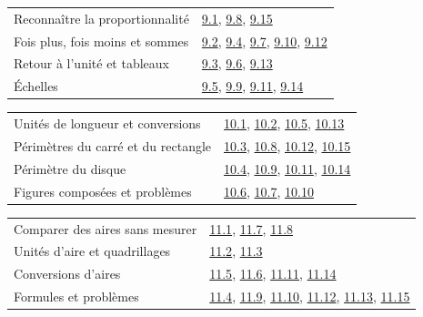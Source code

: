 \begin{tabularx}{\linewidth}{@{}Yl@{}}\toprule
Reconnaître la proportionnalité & \hyperref[exo-9-1]{9.1}, \hyperref[exo-9-8]{9.8}, \hyperref[exo-9-15]{9.15}\\[2mm]
Fois plus, fois moins et sommes & \hyperref[exo-9-2]{9.2}, \hyperref[exo-9-4]{9.4}, \hyperref[exo-9-7]{9.7}, \hyperref[exo-9-10]{9.10}, \hyperref[exo-9-12]{9.12}\\[2mm]
Retour à l’unité et tableaux & \hyperref[exo-9-3]{9.3}, \hyperref[exo-9-6]{9.6}, \hyperref[exo-9-13]{9.13}\\[2mm]
Échelles & \hyperref[exo-9-5]{9.5}, \hyperref[exo-9-9]{9.9}, \hyperref[exo-9-11]{9.11}, \hyperref[exo-9-14]{9.14}\\[2mm]
\bottomrule\end{tabularx}\par\vspace{4mm}
\clearpage
{}\fontsize{10}{13}\selectfont
{}\begin{tabularx}{\linewidth}{@{}Yl@{}}\toprule
Unités de longueur et conversions & \hyperref[exo-10-1]{10.1}, \hyperref[exo-10-2]{10.2}, \hyperref[exo-10-5]{10.5}, \hyperref[exo-10-13]{10.13}\\[2mm]
Périmètres du carré et du rectangle & \hyperref[exo-10-3]{10.3}, \hyperref[exo-10-8]{10.8}, \hyperref[exo-10-12]{10.12}, \hyperref[exo-10-15]{10.15}\\[2mm]
Périmètre du disque & \hyperref[exo-10-4]{10.4}, \hyperref[exo-10-9]{10.9}, \hyperref[exo-10-11]{10.11}, \hyperref[exo-10-14]{10.14}\\[2mm]
Figures composées et problèmes & \hyperref[exo-10-6]{10.6}, \hyperref[exo-10-7]{10.7}, \hyperref[exo-10-10]{10.10}\\[2mm]
\bottomrule\end{tabularx}\par\vspace{4mm}
\begin{tabularx}{\linewidth}{@{}Yl@{}}\toprule
Comparer des aires sans mesurer & \hyperref[exo-11-1]{11.1}, \hyperref[exo-11-7]{11.7}, \hyperref[exo-11-8]{11.8}\\[2mm]
Unités d’aire et quadrillages & \hyperref[exo-11-2]{11.2}, \hyperref[exo-11-3]{11.3}\\[2mm]
Conversions d’aires & \hyperref[exo-11-5]{11.5}, \hyperref[exo-11-6]{11.6}, \hyperref[exo-11-11]{11.11}, \hyperref[exo-11-14]{11.14}\\[2mm]
Formules et problèmes & \hyperref[exo-11-4]{11.4}, \hyperref[exo-11-9]{11.9}, \hyperref[exo-11-10]{11.10}, \hyperref[exo-11-12]{11.12}, \hyperref[exo-11-13]{11.13}, \hyperref[exo-11-15]{11.15}\\[2mm]
\bottomrule\end{tabularx}\par\vspace{4mm}
